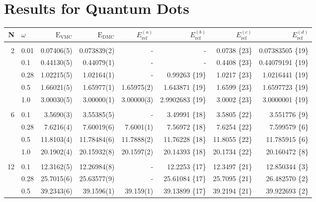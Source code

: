 \section{Results for Quantum Dots}


\setlength{\tabcolsep}{5pt}
\begin{table}
\begin{center}
\begin{tabular}{rl|rrrrrr}
    N     & $\omega$ & $\mathrm{E_{VMC}}$ & $\mathrm{E_{DMC}}$ & $E_\mathrm{ref}^{(a)}$& $E_\mathrm{ref}^{(b)}$ & $E_\mathrm{ref}^{(c)}$ & $E_\mathrm{ref}^{(d)}$\\
\hline\hline
\multicolumn{8}{c}{} \\
    2     &   0.01   & 0.07406(5)  & 0.073839(2)  & -		& -			& 0.0738 \{23\} & 0.07383505 \{19\}\\
          &   0.1    & 0.44130(5)  & 0.44079(1)   & - 		& - 			& 0.4408 \{23\} & 0.44079191 \{19\}\\
          &   0.28   & 1.02215(5)  & 1.02164(1)   & -		&0.99263 \{19\} 	& 1.0217 \{23\}  & 1.0216441 \{19\}\\
          &   0.5    & 1.66021(5)  & 1.65977(1)   & 1.65975(2)&1.643871 \{19\}	& 1.6599 \{23\}  & 1.6597723 \{19\}\\
          &   1.0    & 3.00030(5)  & 3.00000(1)   & 3.00000(3)&2.9902683 \{19\}	& 3.0002 \{23\}  & 3.0000001 \{19\}\\
\cline{2-8}
\multicolumn{8}{c}{} \\
    6     &   0.1    &  3.5690(3)  &  3.55385(5)  & -		&3.49991 \{18\} 	& 3.5805 \{22\}  & 3.551776 \{9\}\\
          &   0.28   &  7.6216(4)  &  7.60019(6)  & 7.6001(1) &7.56972 \{18\} 	& 7.6254 \{22\}  & 7.599579 \{6\}\\
          &   0.5    & 11.8103(4)  & 11.78484(6)  & 11.7888(2)&11.76228 \{18\}	& 11.8055 \{22\} & 11.785915 \{6\}\\
          &   1.0    & 20.1902(4)  & 20.15932(8)  & 20.1597(2)&20.14393 \{18\}	& 20.1734 \{22\} & 20.160472 \{8\}\\
\cline{2-8}
\multicolumn{8}{c}{} \\
    12    &   0.1    & 12.3162(5)  & 12.26984(8)  & - 		&12.2253 \{17\} 	& 12.3497 \{21\} & 12.850344 \{3\}\\
          &   0.28   & 25.7015(6)  & 25.63577(9)  & - 		&25.61084 \{17\} 	& 25.7095 \{21\} & 26.482570 \{2\}\\
          &   0.5    & 39.2343(6)  & 39.1596(1)   & 39.159(1) &39.13899 \{17\}	& 39.2194 \{21\} & 39.922693 \{2\}\\

\end{tabular}
\end{center}
\end{table}
